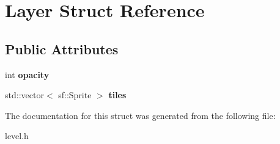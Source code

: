 \hypertarget{struct_layer}{}\section{Layer Struct Reference}
\label{struct_layer}
\subsection*{Public Attributes}
\begin{DoxyCompactItemize}
\item 
\mbox{\label{struct_layer_a335b0615d255a1163f1728a9809423e2}} 
int {\bfseries opacity}
\item 
\mbox{\label{struct_layer_a14ab8b141e54f1e2bfd2a6746c2fc077}} 
std\+::vector$<$ sf\+::\+Sprite $>$ {\bfseries tiles}
\end{DoxyCompactItemize}


The documentation for this struct was generated from the following file\+:\begin{DoxyCompactItemize}
\item 
level.\+h\end{DoxyCompactItemize}
